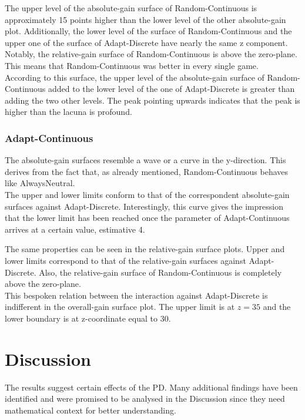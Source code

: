 \documentclass{article}
\begin{document}
		The upper level of the absolute-gain surface of Random-Continuous is approximately 15 points higher than the lower level of the other absolute-gain plot.
		Additionally, the lower level of the surface of Random-Continuous and the upper one of the surface of Adapt-Discrete have nearly the same z component.
		Notably, the relative-gain surface of Random-Continuous is above the zero-plane.
		This means that Random-Continuous was better in every single game.\\

		According to this surface, the upper level of the absolute-gain surface of Random-Continuous added to the lower level of the one of Adapt-Discrete is greater than adding the two other levels.
		The peak pointing upwards indicates that the peak is higher than the lacuna is profound.\\
		

\subsubsection*{Adapt-Continuous}
		The absolute-gain surfaces resemble a wave or a curve in the y-direction.
		This derives from the fact that, as already mentioned, Random-Continuous behaves like AlwaysNeutral.\\
		The upper and lower limits conform to that of the correspondent absolute-gain surfaces against Adapt-Discrete.
		Interestingly, this curve gives the impression that the lower limit has been reached once the parameter of Adapt-Continuous arrives at a certain value, estimative 4.

		The same properties can be seen in the relative-gain surface plots.
		Upper and lower limits correspond to that of the relative-gain surfaces against Adapt-Discrete.
		Also, the relative-gain surface of Random-Continuous is completely above the zero-plane.\\

		This bespoken relation between the interaction against Adapt-Discrete is indifferent in the overall-gain surface plot.
		The upper limit is at $z = 35$ and the lower boundary is at z-coordinate equal to 30.


\section{Discussion}

The results suggest certain effects of the PD.
Many additional findings have been identified and were promised to be analysed in the Discussion since they need mathematical context for better understanding.
\end{document}
